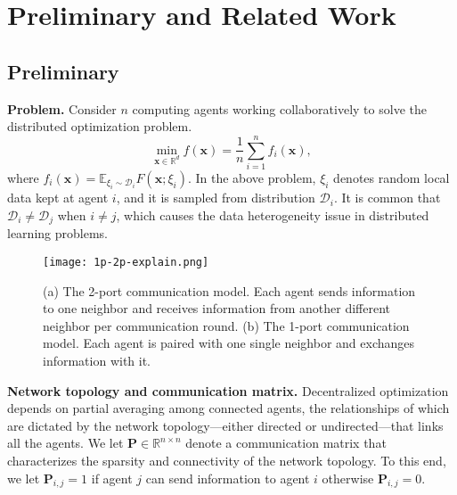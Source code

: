 \documentclass{article}
\newcommand{\bvx}{\boldsymbol{x}}
\newcommand{\vP}{\mathbf{P}}
\newcommand{\bbR}{\mathbb{R}}
\newcommand{\bbE}{\mathbb{E}}
\newcommand{\avein}{\frac{1}{n}\sum_{i=1}^n}
\theoremstyle{plain}
\theoremstyle{definition}
\begin{document}
\section{Preliminary and Related Work}

\subsection{Preliminary}
\textbf{Problem. }Consider $n$ computing agents working collaboratively to solve the distributed optimization problem.
\begin{equation}
\label{eq:opt-problem-setting}
\operatorname{min}_{\bvx\in\bbR^d} f(\bvx)=\avein f_i(\bvx),
\end{equation}
where $f_i(\bvx)=\bbE_{\xi_i\sim \mathcal{D}_i}F(\bvx;\xi_i)$.
In the above problem, $\xi_i$ denotes random local data kept at agent $i$, and it is sampled from distribution $\mathcal{D}_i$. It is common that $\mathcal{D}_i \neq \mathcal{D}_j$ when $i \neq j$, which causes the data heterogeneity issue in distributed learning problems.
\begin{figure}[t]
\begin{center}
\centerline{\texttt{[image: 1p-2p-explain.png]}}
\vskip -0.2in
\caption{
(a) The 2-port communication model. Each agent sends information to one neighbor and receives information from another different neighbor per communication round. (b) The 1-port communication model. Each agent is paired with one single neighbor and exchanges information with it. }
\label{fig:1p-example-n=6-0}
\end{center}
\vskip -0.3in
\end{figure}

\textbf{Network topology and communication matrix.} Decentralized optimization depends on partial averaging {among} connected agents, {the relationships of which are dictated by the network topology—either directed or undirected—that links all the agents.} We let $\vP \in \mathbb{R}^{n\times n}$ denote a communication matrix that characterizes the sparsity and connectivity of the network topology. To this end, we let $\vP_{i,j} = 1$ if agent $j$ can send information to agent $i$ otherwise $\vP_{i,j} = 0$. 
\end{document}
